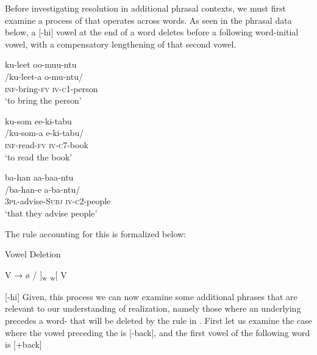 \documentclass[output=paper
,newtxmath
,modfonts
,nonflat]{langsci/langscibook}
\begin{document}
Before investigating  resolution in additional phrasal contexts, we must first examine a process of  that operates across words. As seen in the phrasal data below, a [-hi] vowel at the end of a word deletes before a following word-initial vowel, with a compensatory lengthening of that second vowel.


\ea\label{ex:bickmore:16}
\ea\label{ex:bickmore:16a}
\glll ku-leet oo-muu-ntu  \\
      /ku-leet-a o-mu-ntu/\\
  \textsc{inf-}\textup{bring}\textsc{{}-fv} \textsc{iv-c1-}\textup{person}\\
\glt      ‘to bring the person’

\ex\label{ex:bickmore:16b}
\glll ku-som ee-ki-tabu\\        
/ku-som-a e-ki-tabu/\\
\textsc{inf-}\textup{read}\textsc{{}-fv} \textsc{iv-c7-}\textup{book}\\
\glt      ‘to read the book’

\ex\label{ex:bickmore:16c}
\glll ba-han aa-baa-ntu\\
/ba-han-e a-ba-ntu/\\
\textsc{3pl-}\textup{advise}\textsc{{}-Subj} \textsc{iv-c2-}\textup{people}\\
\glt      ‘that they advise people’
\z
\z

The rule accounting for this is formalized below:

\ea\label{ex:bickmore:17}
Vowel Deletion%
%

         V → ø / \underline{ }\underline{ }\underline{ } ]\textsubscript{w} \textsubscript{w}[ V  

      [-hi]
\z
Given, this process we can now examine some additional phrases that are relevant to our understanding of  realization, namely those where an underlying  precedes a word- that will be deleted by the rule in . First let us examine the case where the vowel preceding the  is [-back], and the first vowel of the following word is [+back]
\end{document}
